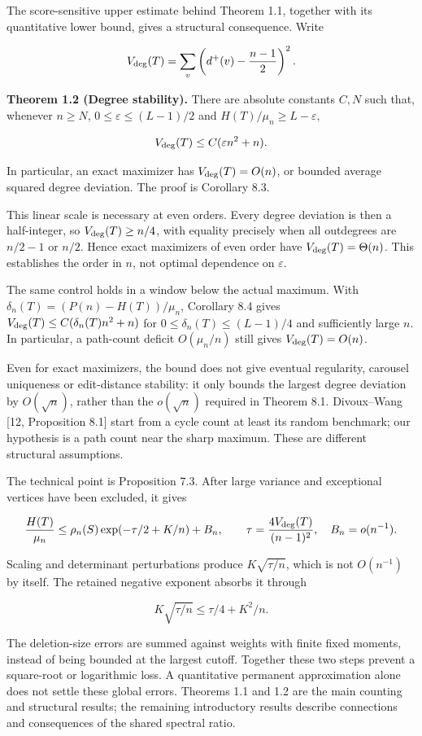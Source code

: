 \documentclass[11pt,a4paper]{article}
\begin{document}
The score-sensitive upper estimate behind Theorem 1.1, together with its quantitative lower bound, gives a structural consequence. Write

\[
V_{\rm deg}(T)=\sum_v\left(d^+(v)-\frac{n-1}{2}\right)^2.
\]

\textbf{Theorem 1.2 (Degree stability).} There are absolute constants \(C,N\) such that, whenever \(n\ge N\), \(0\le\varepsilon\le(L-1)/2\) and \(H(T)/\mu_n\ge L-\varepsilon\),

\[
V_{\rm deg}(T)\le C(\varepsilon n^2+n).
\]

In particular, an exact maximizer has \(V_{\rm deg}(T)=O(n)\), or bounded average squared degree deviation. The proof is Corollary 8.3.

This linear scale is necessary at even orders. Every degree deviation is then a half-integer, so \(V_{\rm deg}(T)\ge n/4\), with equality precisely when all outdegrees are \(n/2-1\) or \(n/2\). Hence exact maximizers of even order have \(V_{\rm deg}(T)=\Theta(n)\). This establishes the order in \(n\), not optimal dependence on \(\varepsilon\).

The same control holds in a window below the actual maximum. With \(\delta_n(T)=(P(n)-H(T))/\mu_n\), Corollary 8.4 gives \(V_{\rm deg}(T)\le C(\delta_n(T)n^2+n)\) for \(0\le\delta_n(T)\le(L-1)/4\) and sufficiently large \(n\). In particular, a path-count deficit \(O(\mu_n/n)\) still gives \(V_{\rm deg}(T)=O(n)\).

Even for exact maximizers, the bound does not give eventual regularity, carousel uniqueness or edit-distance stability: it only bounds the largest degree deviation by \(O(\sqrt n)\), rather than the \(o(\sqrt n)\) required in Theorem 8.1. Divoux--Wang {[}12, Proposition 8.1{]} start from a cycle count at least its random benchmark; our hypothesis is a path count near the sharp maximum. These are different structural assumptions.

The technical point is Proposition 7.3. After large variance and exceptional vertices have been excluded, it gives

\[
\frac{H(T)}{\mu_n}\le\rho_n(S)\exp(-\tau/2+K/n)+B_n,
\qquad \tau=\frac{4V_{\rm deg}(T)}{(n-1)^2},\quad B_n=o(n^{-1}).
\]

Scaling and determinant perturbations produce \(K\sqrt{\tau/n}\), which is not \(O(n^{-1})\) by itself. The retained negative exponent absorbs it through

\[
K\sqrt{\tau/n}\le\tau/4+K^2/n.
\]

The deletion-size errors are summed against weights with finite fixed moments, instead of being bounded at the largest cutoff. Together these two steps prevent a square-root or logarithmic loss. A quantitative permanent approximation alone does not settle these global errors. Theorems 1.1 and 1.2 are the main counting and structural results; the remaining introductory results describe connections and consequences of the shared spectral ratio.
\end{document}
